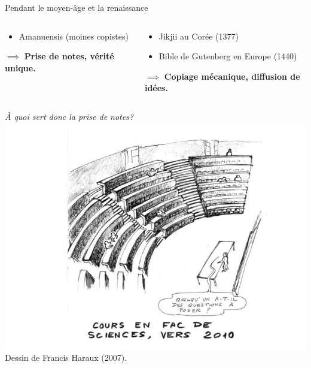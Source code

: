 \begin{frame}{Pendant le moyen-âge et la renaissance}
\begin{columns}
\begin{column}{0.49\linewidth}
\begin{itemize}
			\item Amanuensis (moines copistes)
		\end{itemize}
		$\implies$ \textbf{Prise de notes, vérité unique.}
	\end{column}
	\begin{column}{0.49\linewidth}
		\begin{itemize}
			\item Jikjii au Corée (1377)
			\item Bible de Gutenberg en Europe (1440)
		\end{itemize}
		$\implies$ \textbf{Copiage mécanique, diffusion de idées.}
	\end{column}
\end{columns}
\end{frame}
\begin{frame}
\centering
\huge \emph{À quoi sert donc la prise de notes?}
\vfill
\centering
\includegraphics[height=0.5\paperheight]{../resources/illustrations/cours_magistral} \\
\vfill \hfill
\large Dessin de Francis Haraux (2007).\hfill \hfill
\end{frame}

